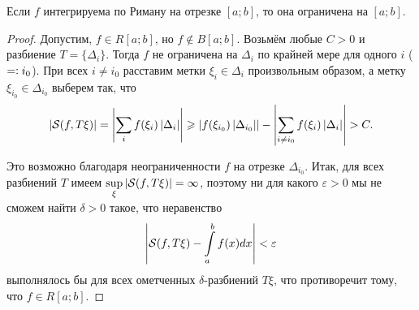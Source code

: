 \begin{proposal}
    Если $f$ интегрируема по Риману на отрезке $[a; b]$, то она ограничена на $[a; b]$.
\end{proposal}

\begin{proof}
    Допустим, $f \in R[a; b]$, но $f \notin B[a; b]$. Возьмём любые $C > 0$ и разбиение $T = \{\Delta_i\}$. Тогда $f$ не ограничена на $\Delta_i$ по крайней мере для одного $i$ ($=\vcentcolon i_0$). При всех $i \ne i_0$ расставим метки $\xi_i \in \Delta_i$ произвольным образом, а метку $\xi_{i_0} \in \Delta_{i_0}$ выберем так, что
    \[
        \left\lvert\mathcal{S}(f, T\xi)\right\rvert = \left\lvert\sum_if(\xi_i)\left\lvert\Delta_i\right\rvert\right\rvert \geqslant \left\lvert f(\xi_{i_0})\left\lvert\Delta_{i_0}\right\rvert\right\rvert - \left\lvert\sum_{i \ne i_0}f(\xi_i)\left\lvert\Delta_i\right\rvert\right\rvert > C.
    \]

    Это возможно благодаря неограниченности $f$ на отрезке $\Delta_{i_0}$. Итак, для всех разбиений $T$ имеем $\sup\limits_\xi\left\lvert\mathcal{S}(f, T\xi)\right\rvert = \infty$, поэтому ни для какого $\varepsilon > 0$ мы не сможем найти $\delta > 0$ такое, что неравенство \[\displaystyle\left\lvert\mathcal{S}(f, T\xi) - \int\limits_a^bf(x)dx\right\rvert < \varepsilon\] выполнялось бы для всех ометченных $\delta$-разбиений $T\xi$, что противоречит тому, что $f \in R[a; b]$.
\end{proof}

